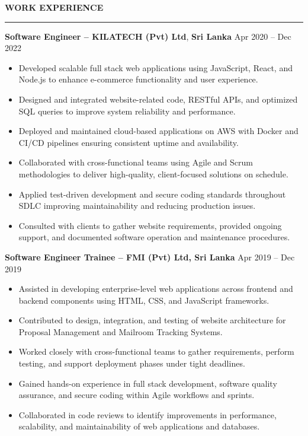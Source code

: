 \documentclass[10pt,letterpaper]{article}
\begin{document}
\vspace{8pt}

\textbf{WORK EXPERIENCE}\\[-8pt]
\noindent\rule{\textwidth}{1pt}

\vspace{-2pt}

\textbf{Software Engineer -- KILATECH (Pvt) Ltd}, \textbf{Sri Lanka} \hfill Apr 2020 -- Dec 2022

\vspace{-1pt}

\begin{itemize}
\item Developed scalable full stack web applications using JavaScript, React, and Node.js to enhance e-commerce functionality and user experience.
\item Designed and integrated website-related code, RESTful APIs, and optimized SQL queries to improve system reliability and performance.
\item Deployed and maintained cloud-based applications on AWS with Docker and CI/CD pipelines ensuring consistent uptime and availability.
\item Collaborated with cross-functional teams using Agile and Scrum methodologies to deliver high-quality, client-focused solutions on schedule.
\item Applied test-driven development and secure coding standards throughout SDLC improving maintainability and reducing production issues.
\item Consulted with clients to gather website requirements, provided ongoing support, and documented software operation and maintenance procedures.
\end{itemize}

\textbf{Software Engineer Trainee -- FMI (Pvt) Ltd, Sri Lanka} \hfill Apr 2019 -- Dec 2019

\vspace{-1pt}

\begin{itemize}
\item Assisted in developing enterprise-level web applications across frontend and backend components using HTML, CSS, and JavaScript frameworks.
\item Contributed to design, integration, and testing of website architecture for Proposal Management and Mailroom Tracking Systems.
\item Worked closely with cross-functional teams to gather requirements, perform testing, and support deployment phases under tight deadlines.
\item Gained hands-on experience in full stack development, software quality assurance, and secure coding within Agile workflows and sprints.
\item Collaborated in code reviews to identify improvements in performance, scalability, and maintainability of web applications and databases.
\end{itemize}
\end{document}
